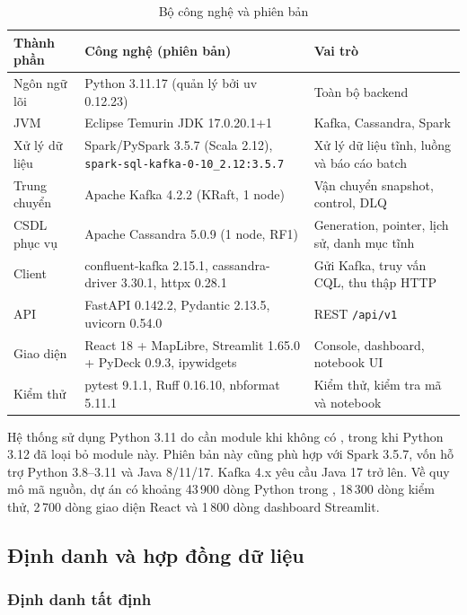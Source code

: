 \begin{table}[H]
\centering
\tablefont
\caption{Bộ công nghệ và phiên bản}
\label{tab:stack}
\begin{tabular}{p{3.49cm}p{6.21cm}p{5.43cm}}
\toprule
\textbf{Thành phần} & \textbf{Công nghệ (phiên bản)} & \textbf{Vai trò} \\
\midrule
Ngôn ngữ lõi & Python 3.11.17 (quản lý bởi uv 0.12.23) & Toàn bộ backend \\
JVM & Eclipse Temurin JDK 17.0.20.1+1 & Kafka, Cassandra, Spark \\
Xử lý dữ liệu & Spark/PySpark 3.5.7 (Scala 2.12), \texttt{spark-sql-kafka-0-10\_2.12:3.5.7} & Xử lý dữ liệu tĩnh, luồng và báo cáo batch \\
Trung chuyển & Apache Kafka 4.2.2 (KRaft, 1 node) & Vận chuyển snapshot, control, DLQ \\
CSDL phục vụ & Apache Cassandra 5.0.9 (1 node, RF1) & Generation, pointer, lịch sử, danh mục tĩnh \\
Client & confluent-kafka 2.15.1, cassandra-driver 3.30.1, httpx 0.28.1 & Gửi Kafka, truy vấn CQL, thu thập HTTP \\
API & FastAPI 0.142.2, Pydantic 2.13.5, uvicorn 0.54.0 & REST \texttt{/api/v1} \\
Giao diện & React 18 + MapLibre, Streamlit 1.65.0 + PyDeck 0.9.3, ipywidgets & Console, dashboard, notebook UI \\
Kiểm thử & pytest 9.1.1, Ruff 0.16.10, nbformat 5.11.1 & Kiểm thử, kiểm tra mã và notebook \\
\bottomrule
\end{tabular}
\end{table}

Hệ thống sử dụng Python 3.11 do  cần module  khi không có , trong khi Python 3.12 đã loại bỏ module này. Phiên bản này cũng phù hợp với Spark 3.5.7, vốn hỗ trợ Python 3.8--3.11 và Java 8/11/17. Kafka 4.x yêu cầu Java 17 trở lên. Về quy mô mã nguồn, dự án có khoảng 43\,900 dòng Python trong , 18\,300 dòng kiểm thử, 2\,700 dòng giao diện React và 1\,800 dòng dashboard Streamlit.

\subsection{Định danh và hợp đồng dữ liệu}

\subsubsection{Định danh tất định}

